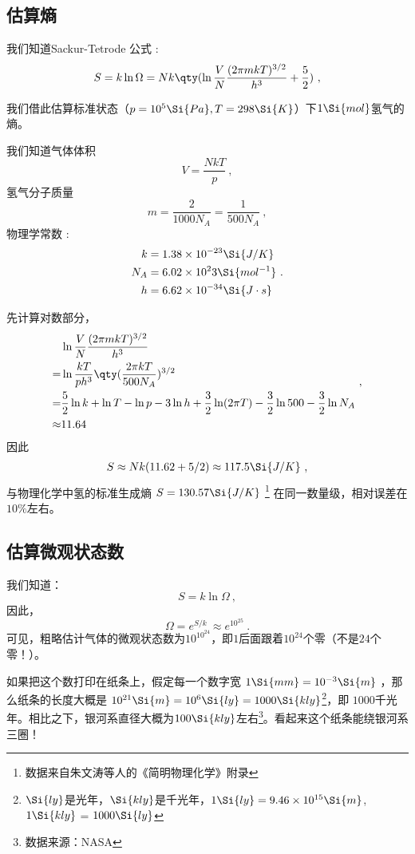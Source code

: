 

\subsection{估算熵}
我们知道Sackur-Tetrode 公式 :
\begin{equation}
S = k\ln \Omega  = Nk \qty(\ln \frac{V}{N} \frac{(2\pi mkT)^{3/2}}{h^3} + \frac52)~,
\end{equation}

我们借此估算标准状态（$p=10^5 \Si{Pa}, T=298\Si{K}$）下$1 \Si{mol}$氢气的熵。

我们知道气体体积 
$$V=\frac{NkT}{p}~,$$
氢气分子质量 
$$m = \frac{2}{1000 N_A} = \frac{1}{500 N_A}~,$$
物理学常数 : 
$$
\begin{aligned}
k &= 1.38 \times 10^{-23}\Si{J/K}\\
N_A &= 6.02 \times 10^23 \Si{mol^{-1}}\\
h &= 6.62\times10^{-34} \Si{J\cdot s}
\end{aligned}
~.$$

先计算对数部分，
$$
\begin{aligned}
 & \ln \frac{V}{N} \frac{(2\pi mkT)^{3/2}}{h^3} \\
 = & \ln \frac{kT}{p h^3} \qty(\frac{2\pi kT}{500 N_A})^{3/2}\\
 = & \frac{5}{2} \ln k + \ln T - \ln p - 3 \ln h + \frac{3}{2} \ln (2 \pi T) - \frac{3}{2} \ln 500 - \frac{3}{2} \ln N_A \\
 \approx & 11.64\\
\end{aligned}~,
$$
因此
$$
\begin{aligned}
S \approx Nk (11.62+5/2) \approx 117.5 \Si{J/K}
\end{aligned}~,
$$
与物理化学中氢的标准生成熵 $S = 130.57 \Si{J/K}$ \footnote{数据来自朱文涛等人的《简明物理化学》附录} 在同一数量级，相对误差在$10\%$左右。

\subsection{估算微观状态数}
我们知道：
\begin{equation}
S = k \ln \Omega~,
\end{equation}
因此，
$$
\Omega = e^{S/k}~ \approx e^{10^{25}} ~.
$$
可见，粗略估计气体的微观状态数为$10^{10^{24}}$，即$1$后面跟着$10^{24}$个零（不是$24$个零！）。

如果把这个数打印在纸条上，假定每一个数字宽 $1 \Si{mm} = 10^{-3} \Si{m}$ ，那么纸条的长度大概是 $10^{21} \Si{m} = 10^6 \Si{ly} = 1000 \Si{kly}$\footnote{$\Si{ly}$是光年，$\Si{kly}$是千光年，$1 \Si{ly} = 9.46\times10^{15} \Si{m}$, $1 \Si{kly}$ = $1000 \Si{ly}$}，即 $1000$千光年。相比之下，银河系直径大概为$100 \Si{kly}$左右\footnote{数据来源：NASA}。看起来这个纸条能绕银河系三圈！

